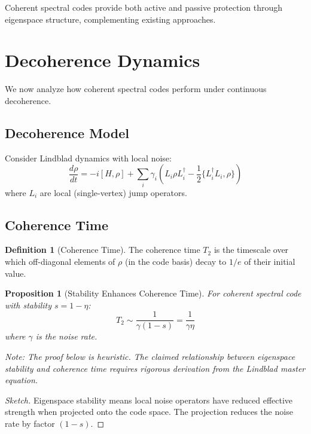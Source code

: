 \documentclass[11pt,a4paper]{article}
\newtheorem{proposition}[theorem]{Proposition}
\theoremstyle{definition}
\newtheorem{definition}[theorem]{Definition}
\begin{document}
Coherent spectral codes provide both active and passive protection through eigenspace structure, complementing existing approaches.

\section{Decoherence Dynamics}
\label{sec:decoherence}

We now analyze how coherent spectral codes perform under continuous decoherence.

\subsection{Decoherence Model}

Consider Lindblad dynamics with local noise:
\begin{equation}
    \frac{d\rho}{dt} = -i[H, \rho] + \sum_i \gamma_i \left( L_i \rho L_i^\dagger - \frac{1}{2}\{L_i^\dagger L_i, \rho\} \right)
\end{equation}
where $L_i$ are local (single-vertex) jump operators.

\subsection{Coherence Time}

\begin{definition}[Coherence Time]
The coherence time $T_2$ is the timescale over which off-diagonal elements of $\rho$ (in the code basis) decay to $1/e$ of their initial value.
\end{definition}

\begin{proposition}[Stability Enhances Coherence Time]
For coherent spectral code with stability $s = 1 - \eta$:
\begin{equation}
    T_2 \sim \frac{1}{\gamma(1-s)} = \frac{1}{\gamma \eta}
\end{equation}
where $\gamma$ is the noise rate.

\noindent\textit{Note: The proof below is heuristic. The claimed relationship between eigenspace stability and coherence time requires rigorous derivation from the Lindblad master equation.}
\end{proposition}

\begin{proof}[Sketch]
Eigenspace stability means local noise operators have reduced effective strength when projected onto the code space. The projection reduces the noise rate by factor $(1-s)$.
\end{proof}
\end{document}
